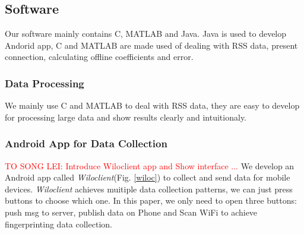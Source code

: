 \documentclass[10pt,conference]{IEEEtran}
\newcommand{\yc}[1]{\textcolor{red}{#1}}
\begin{document}
\subsection{Software}
Our software mainly contains C, MATLAB and Java. Java is used to develop Andorid app, C and MATLAB are made used of dealing with RSS data, present connection, calculating offline coefficients and error.
\subsubsection{Data Processing}
We mainly use C and MATLAB to deal with RSS data, they are easy to develop for processing large data and show results clearly and intuitionaly.
\subsubsection{Android App for Data Collection}
\yc{TO SONG LEI: Introduce Wiloclient app and Show interface ...}
We develop an Android app called \textit{Wiloclient}(Fig. \ref{wiloc}) to collect and send data for mobile devices. \textit{Wiloclient} achieves muitiple data collection patterns, we can just press buttons to choose which one. In this paper, we only need to open three buttons: push msg to server, publish data on Phone and Scan WiFi to achieve fingerprinting data collection.
\end{document}
